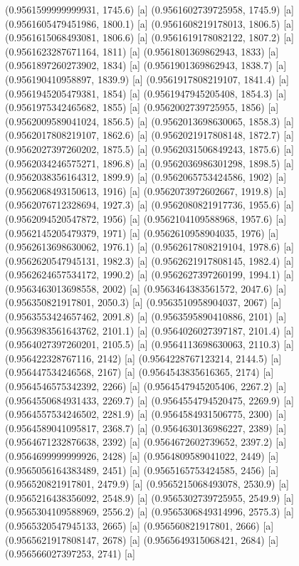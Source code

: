 {{{(0.9561599999999931, 1745.6) [a] 
(0.9561602739725958, 1745.9) [a] 
(0.9561605479451986, 1800.1) [a] 
(0.9561608219178013, 1806.5) [a] 
(0.9561615068493081, 1806.6) [a] 
(0.9561619178082122, 1807.2) [a] 
(0.9561623287671164, 1811) [a] 
(0.9561801369862943, 1833) [a] 
(0.9561897260273902, 1834) [a] 
(0.9561901369862943, 1838.7) [a] 
(0.956190410958897, 1839.9) [a] 
(0.9561917808219107, 1841.4) [a] 
(0.9561945205479381, 1854) [a] 
(0.9561947945205408, 1854.3) [a] 
(0.9561975342465682, 1855) [a] 
(0.9562002739725955, 1856) [a] 
(0.9562009589041024, 1856.5) [a] 
(0.9562013698630065, 1858.3) [a] 
(0.9562017808219107, 1862.6) [a] 
(0.9562021917808148, 1872.7) [a] 
(0.9562027397260202, 1875.5) [a] 
(0.9562031506849243, 1875.6) [a] 
(0.9562034246575271, 1896.8) [a] 
(0.9562036986301298, 1898.5) [a] 
(0.9562038356164312, 1899.9) [a] 
(0.9562065753424586, 1902) [a] 
(0.9562068493150613, 1916) [a] 
(0.9562073972602667, 1919.8) [a] 
(0.9562076712328694, 1927.3) [a] 
(0.9562080821917736, 1955.6) [a] 
(0.9562094520547872, 1956) [a] 
(0.9562104109588968, 1957.6) [a] 
(0.9562145205479379, 1971) [a] 
(0.9562610958904035, 1976) [a] 
(0.9562613698630062, 1976.1) [a] 
(0.9562617808219104, 1978.6) [a] 
(0.9562620547945131, 1982.3) [a] 
(0.9562621917808145, 1982.4) [a] 
(0.9562624657534172, 1990.2) [a] 
(0.9562627397260199, 1994.1) [a] 
(0.9563463013698558, 2002) [a] 
(0.9563464383561572, 2047.6) [a] 
(0.956350821917801, 2050.3) [a] 
(0.9563510958904037, 2067) [a] 
(0.9563553424657462, 2091.8) [a] 
(0.9563595890410886, 2101) [a] 
(0.9563983561643762, 2101.1) [a] 
(0.9564026027397187, 2101.4) [a] 
(0.9564027397260201, 2105.5) [a] 
(0.9564113698630063, 2110.3) [a] 
(0.956422328767116, 2142) [a] 
(0.9564228767123214, 2144.5) [a] 
(0.956447534246568, 2167) [a] 
(0.9564543835616365, 2174) [a] 
(0.9564546575342392, 2266) [a] 
(0.9564547945205406, 2267.2) [a] 
(0.9564550684931433, 2269.7) [a] 
(0.9564554794520475, 2269.9) [a] 
(0.9564557534246502, 2281.9) [a] 
(0.9564584931506775, 2300) [a] 
(0.9564589041095817, 2368.7) [a] 
(0.9564630136986227, 2389) [a] 
(0.9564671232876638, 2392) [a] 
(0.9564672602739652, 2397.2) [a] 
(0.9564699999999926, 2428) [a] 
(0.9564809589041022, 2449) [a] 
(0.9565056164383489, 2451) [a] 
(0.9565165753424585, 2456) [a] 
(0.956520821917801, 2479.9) [a] 
(0.9565215068493078, 2530.9) [a] 
(0.9565216438356092, 2548.9) [a] 
(0.9565302739725955, 2549.9) [a] 
(0.9565304109588969, 2556.2) [a] 
(0.9565306849314996, 2575.3) [a] 
(0.9565320547945133, 2665) [a] 
(0.956560821917801, 2666) [a] 
(0.9565621917808147, 2678) [a] 
(0.9565649315068421, 2684) [a] 
(0.956566027397253, 2741) [a] 
}}}

